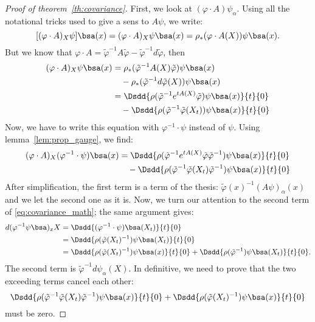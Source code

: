 \begin{proof}[Proof of theorem~\ref{th:covariance}]
First, we look at $(\varphi\cdot A)\psi_{\alpha}$. Using all the notational tricks used to give a sens to $A\psi$, we write:
\[
   [(\varphi\cdot A)_X\psi]\bsa(x)=(\varphi\cdot A)_X\psi\bsa(x)=\rho_*(\varphi\cdot A(X))\psi\bsa(x).
\]
But we know that $\varphi\cdot A=\tilde{\varphi}^{-1} A\tilde{\varphi}-\tilde{\varphi}^{-1} d\tilde{\varphi}$, then
\begin{equation}\label{eq:en_deux}
\begin{split}
  (\varphi\cdot A)_X\psi\bsa(x)
  &=\rho_*(\tilde{\varphi}^{-1} A(X)\tilde{\varphi})\psi\bsa(x)\\
  &\quad-\rho_*(\tilde{\varphi}^{-1} d\tilde{\varphi}(X))\psi\bsa(x)\\
  &=\Dsdd{ \rho(\tilde{\varphi}^{-1} e^{tA(X)}\tilde{\varphi})\psi\bsa(x)}{t}{0}\\
 &\quad-\Dsdd{ \rho(\tilde{\varphi}^{-1}\tilde{\varphi}(X_t))\psi\bsa(x) }{t}{0}
\end{split}
\end{equation}
Now, we have to write this equation with $\varphi^{-1}\cdot\psi$ instead of $\psi$. Using lemma~\ref{lem:prop_gauge}, we find:
\begin{equation}
\begin{split}
   (\varphi\cdot A)_X(\varphi^{-1}\cdot\psi)\bsa(x)
   &=\Dsdd{ \rho(\tilde{\varphi}^{-1} e^{tA(X)}\tilde{\varphi}\tilde{\varphi}^{-1})\psi\bsa(x)}{t}{0}\\
   &\quad-\Dsdd{ \rho(\tilde{\varphi}^{-1}\tilde{\varphi}(X_t)\tilde{\varphi}^{-1})\psi\bsa(x) }{t}{0}
\end{split}
\end{equation}
After simplification, the first term is a term of the thesis: $\tilde{\varphi}(x)^{-1}(A\psi)_{\alpha}(x)$ and we let the second one as it is. Now, we turn our attention to the second term of \eqref{eq:covariance_math}; the same argument gives:
\begin{equation}
\begin{split}
  d(\varphi^{-1}\psi\bsa)_xX
  &=\Dsdd{(\varphi^{-1}\cdot\psi)\bsa(X_t)}{t}{0}\\
  &=\Dsdd{\rho(\tilde{\varphi}(X_t)^{-1})\psi\bsa(X_t)}{t}{0}\\
  &=\Dsdd{\rho(\tilde{\varphi}(X_t)^{-1})\psi\bsa(x)}{t}{0}
  +\Dsdd{\rho(\tilde{\varphi}^{-1})\psi\bsa(X_t)}{t}{0}.
\end{split}
\end{equation}
The second term is $\tilde{\varphi}^{-1} d\psi_{\alpha}(X)$. In definitive, we need to prove that the two exceeding terms cancel each other:
\begin{equation}\label{eq:le_zero}
  \Dsdd{\rho(\tilde{\varphi}^{-1}\tilde{\varphi}(X_t)\tilde{\varphi}^{-1})\psi\bsa(x)}{t}{0}
  +\Dsdd{\rho(\tilde{\varphi}(X_t)^{-1})\psi\bsa(x)}{t}{0}
\end{equation}
must be zero.


\end{proof}
